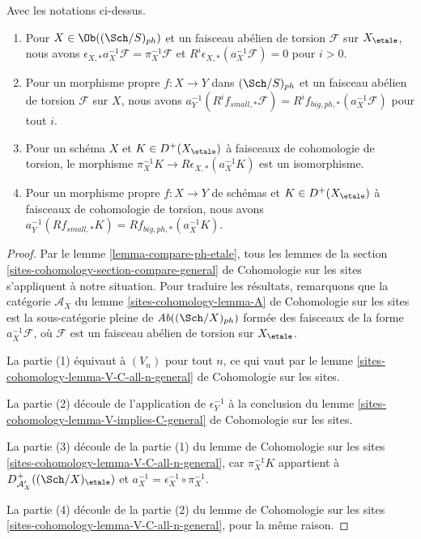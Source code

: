\begin{lemma}
\label{lemma-V-C-all-n-etale-ph}
Avec les notations ci-dessus.
\begin{enumerate}
\item Pour $X \in \Ob((\Sch/S)_{ph})$ et un faisceau abélien de torsion $\mathcal{F}$
sur $X_\etale$, nous avons
$\epsilon_{X, *}a_X^{-1}\mathcal{F} = \pi_X^{-1}\mathcal{F}$
et $R^i\epsilon_{X, *}(a_X^{-1}\mathcal{F}) = 0$ pour $i > 0$.
\item Pour un morphisme propre $f : X \to Y$ dans $(\Sch/S)_{ph}$
et un faisceau abélien de torsion $\mathcal{F}$ sur $X$, nous avons
$a_Y^{-1}(R^if_{small, *}\mathcal{F}) =
R^if_{big, ph, *}(a_X^{-1}\mathcal{F})$
pour tout $i$.
\item Pour un schéma $X$ et $K \in D^+(X_\etale)$ à faisceaux de
cohomologie de torsion, le morphisme
$\pi_X^{-1}K \to R\epsilon_{X, *}(a_X^{-1}K)$ est un isomorphisme.
\item Pour un morphisme propre $f : X \to Y$ de schémas
et $K \in D^+(X_\etale)$ à faisceaux de cohomologie de torsion, nous avons
$a_Y^{-1}(Rf_{small, *}K) = Rf_{big, ph, *}(a_X^{-1}K)$.
\end{enumerate}
\end{lemma}

\begin{proof}
Par le lemme \ref{lemma-compare-ph-etale}, tous les lemmes de la
section \ref{sites-cohomology-section-compare-general} de Cohomologie sur les sites
s'appliquent à notre situation. Pour traduire les résultats,
remarquons que la catégorie $\mathcal{A}_X$ du
lemme \ref{sites-cohomology-lemma-A} de Cohomologie sur les sites
est la sous-catégorie pleine de $\textit{Ab}((\Sch/X)_{ph})$
formée des faisceaux de la forme $a_X^{-1}\mathcal{F}$,
où $\mathcal{F}$ est un faisceau abélien de torsion sur $X_\etale$.

\medskip\noindent
La partie (1) équivaut à $(V_n)$ pour tout $n$, ce qui vaut par le
lemme \ref{sites-cohomology-lemma-V-C-all-n-general} de Cohomologie sur les sites.

\medskip\noindent
La partie (2) découle de l'application de $\epsilon_Y^{-1}$ à la conclusion du
lemme \ref{sites-cohomology-lemma-V-implies-C-general} de Cohomologie sur les sites.

\medskip\noindent
La partie (3) découle de la partie (1) du lemme de Cohomologie sur les sites
\ref{sites-cohomology-lemma-V-C-all-n-general},
car $\pi_X^{-1}K$ appartient à $D^+_{\mathcal{A}'_X}((\Sch/X)_\etale)$
et $a_X^{-1} = \epsilon_X^{-1} \circ \pi_X^{-1}$.

\medskip\noindent
La partie (4) découle de la partie (2) du lemme de Cohomologie sur les sites
\ref{sites-cohomology-lemma-V-C-all-n-general},
pour la même raison.
\end{proof}

